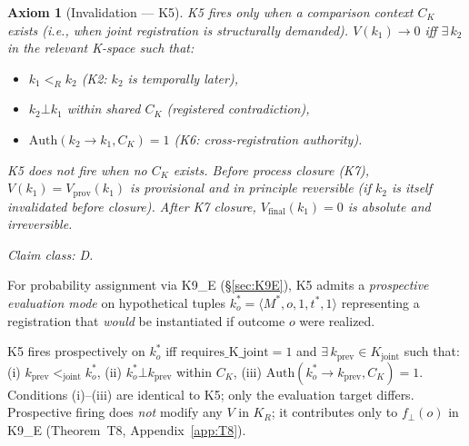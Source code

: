 \documentclass[12pt,a4paper]{article}
\theoremstyle{plain}
\newtheorem{axiom}{Axiom}[section]
\theoremstyle{definition}
\theoremstyle{remark}
\newcommand{\KR}{K_{\!R}}
\newcommand{\Kjoint}{K_{\mathrm{joint}}}
\newcommand{\Vp}{V_{\mathrm{prov}}}
\newcommand{\Vf}{V_{\mathrm{final}}}
\newcommand{\fperp}{f_{\!\perp}}
\newcommand{\CK}{C_K}
\newcommand{\Auth}{\mathrm{Auth}}
\newcommand{\bk}[1]{\langle #1 \rangle}
\begin{document}
\begin{axiom}[Invalidation --- K5]\label{ax:K5}
K5 fires only when a comparison context $\CK$ exists
(i.e., when joint registration is structurally demanded).
$V(k_1) \to 0$ iff $\exists\, k_2$ in the relevant K-space such that:
\begin{itemize}[noitemsep,topsep=2pt]
  \item[(i)]  $k_1 <_R k_2$ \hfill(K2: $k_2$ is temporally later),
  \item[(ii)] $k_2 \bot k_1$ within shared $\CK$ \hfill(registered
              contradiction),
  \item[(iii)] $\Auth(k_2 \to k_1, \CK) = 1$ \hfill(K6:
              cross-registration authority).
\end{itemize}
K5 \emph{does not fire} when no $\CK$ exists. Before process closure
(K7), $V(k_1) = \Vp(k_1)$ is provisional and in principle reversible
(if $k_2$ is itself invalidated before closure). After K7 closure,
$\Vf(k_1) = 0$ is absolute and irreversible.

\smallskip
\noindent\textit{Claim class}: D.
\end{axiom}

\begin{tcolorbox}[colback=orange!7,colframe=orange!60,
    title=\small\textbf{K5\_prospective~[EXTENSION --- required for K9\_E only]},
    fonttitle=\small,breakable]
\small
For probability assignment via K9\_E (\S\ref{sec:K9E}), K5 admits a
\emph{prospective evaluation mode} on hypothetical tuples
$k_o^* = \bk{M^*, o, 1, t^*, 1}$ representing a registration that
\emph{would} be instantiated if outcome $o$ were realized.

\smallskip
K5 fires prospectively on $k_o^*$ iff
$\mathrm{requires\_K\_joint} = 1$ and
$\exists\, k_{\mathrm{prev}} \in \Kjoint$ such that:
\textup{(i)} $k_{\mathrm{prev}} <_{\mathrm{joint}} k_o^*$,
\textup{(ii)} $k_o^* \bot k_{\mathrm{prev}}$ within $\CK$,
\textup{(iii)} $\Auth(k_o^* \to k_{\mathrm{prev}}, \CK) = 1$.
Conditions (i)--(iii) are identical to K5; only the evaluation target
differs. Prospective firing does \emph{not} modify any $V$ in $\KR$;
it contributes only to $\fperp(o)$ in K9\_E (Theorem~T8,
Appendix~\ref{app:T8}).
\end{tcolorbox}
\end{document}
